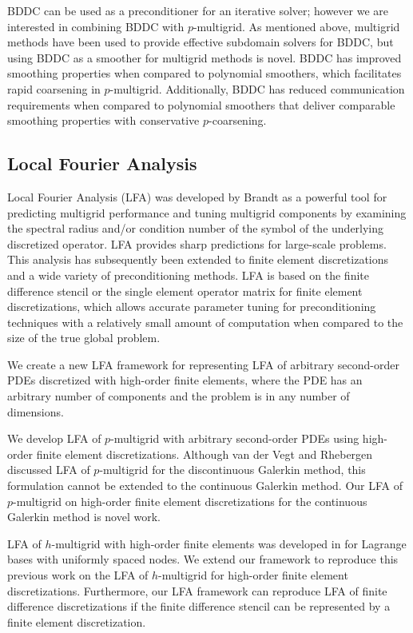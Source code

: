 BDDC can be used as a preconditioner for an iterative solver; however we are interested in combining BDDC with $p$-multigrid.
As mentioned above, multigrid methods have been used to provide effective subdomain solvers for BDDC, but using BDDC as a smoother for multigrid methods is novel.
BDDC has improved smoothing properties when compared to polynomial smoothers, which facilitates rapid coarsening in $p$-multigrid.
Additionally, BDDC has reduced communication requirements when compared to polynomial smoothers that deliver comparable smoothing properties with conservative $p$-coarsening.

\subsection{Local Fourier Analysis}

Local Fourier Analysis (LFA) was developed by Brandt \cite{brandt1977multi,wienands2004practical} as a powerful tool for predicting multigrid performance and tuning multigrid components by examining the spectral radius and/or condition number of the symbol of the underlying discretized operator.
LFA provides sharp predictions for large-scale problems.
This analysis has subsequently been extended to finite element discretizations and a wide variety of preconditioning methods.
LFA is based on the finite difference stencil or the single element operator matrix for finite element discretizations, which allows accurate parameter tuning for preconditioning techniques with a relatively small amount of computation when compared to the size of the true global problem.

We create a new LFA framework for representing LFA of arbitrary second-order PDEs discretized with high-order finite elements, where the PDE has an arbitrary number of components and the problem is in any number of dimensions.

We develop LFA of $p$-multigrid with arbitrary second-order PDEs using high-order finite element discretizations.
Although van der Vegt and Rhebergen \cite{van2011discrete} discussed LFA of $p$-multigrid for the discontinuous Galerkin method, this formulation cannot be extended to the continuous Galerkin method.
Our LFA of $p$-multigrid on high-order finite element discretizations for the continuous Galerkin method is novel work.

LFA of $h$-multigrid with high-order finite elements was developed in \cite{he2020two} for Lagrange bases with uniformly spaced nodes.
We extend our framework to reproduce this previous work on the LFA of $h$-multigrid for high-order finite element discretizations.
Furthermore, our LFA framework can reproduce LFA of finite difference discretizations if the finite difference stencil can be represented by a finite element discretization.

